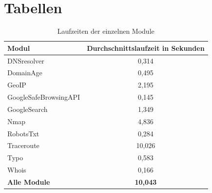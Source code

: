 




\listoftodos %

\tableofcontents %











\chapter{Tabellen}

\begin{table}[!hbt]
	\begin{center}
		\begin{tabular}{ l c }
			\toprule
			\textbf{Modul} & \textbf{Durchschnittslaufzeit in Sekunden}\\
			\midrule   
			DNSresolver            & 0,314 \\
			DomainAge               & 0,495 \\
			GeoIP                   & 2,195 \\
			GoogleSafeBrowsingAPI   & 0,145 \\
			GoogleSearch            & 1,349 \\
			Nmap                    & 4,836 \\
			RobotsTxt               & 0,284 \\
			Traceroute              & 10,026 \\
			Typo                    & 0,583 \\
			Whois                   & 0,166 \\
			\midrule
			\textbf{Alle Module}    & \textbf{10,043} \\
			\bottomrule
		\end{tabular}
		\caption{Laufzeiten der einzelnen Module}\label{tab.laufzeit}
	\end{center}
\end{table}


